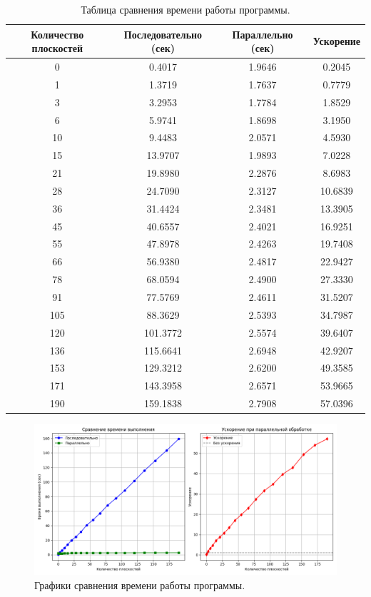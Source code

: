 \begin{table}[ht]
\centering
\caption{Таблица сравнения времени работы программы.}
\begin{tabular}{|c|c|c|c|}
\hline
\textbf{Количество плоскостей} & \textbf{Последовательно (сек)} & \textbf{Параллельно (сек)} & \textbf{Ускорение} \\ \hline
0   & 0.4017  & 1.9646  & 0.2045  \\ \hline
1   & 1.3719  & 1.7637  & 0.7779  \\ \hline
3   & 3.2953  & 1.7784  & 1.8529  \\ \hline
6   & 5.9741  & 1.8698  & 3.1950  \\ \hline
10  & 9.4483  & 2.0571  & 4.5930  \\ \hline
15  & 13.9707 & 1.9893  & 7.0228  \\ \hline
21  & 19.8980 & 2.2876  & 8.6983  \\ \hline
28  & 24.7090 & 2.3127  & 10.6839 \\ \hline
36  & 31.4424 & 2.3481  & 13.3905 \\ \hline
45  & 40.6557 & 2.4021  & 16.9251 \\ \hline
55  & 47.8978 & 2.4263  & 19.7408 \\ \hline
66  & 56.9380 & 2.4817  & 22.9427 \\ \hline
78  & 68.0594 & 2.4900  & 27.3330 \\ \hline
91  & 77.5769 & 2.4611  & 31.5207 \\ \hline
105 & 88.3629 & 2.5393  & 34.7987 \\ \hline
120 & 101.3772 & 2.5574 & 39.6407 \\ \hline
136 & 115.6641 & 2.6948 & 42.9207 \\ \hline
153 & 129.3212 & 2.6200 & 49.3585 \\ \hline
171 & 143.3958 & 2.6571 & 53.9665 \\ \hline
190 & 159.1838 & 2.7908 & 57.0396 \\ \hline
\end{tabular}
\label{tab:performance_results}
\end{table}

\begin{figure}[H]
    \centering
    \includegraphics[width=1\textwidth]{img/test_calc_pixel_matrix_performance.png}
    \caption{Графики сравнения времени работы программы.}
    \label{fig:performance_results}
\end{figure}

